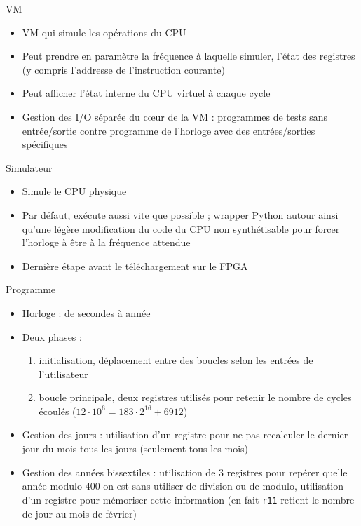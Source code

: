 \documentclass{beamer}
\begin{document}
\begin{frame}{VM}
    \begin{itemize}
        \item VM qui simule les opérations du CPU
        \item Peut prendre en paramètre la fréquence à laquelle simuler, l'état des registres (y compris l'addresse de l'instruction courante)
        \item Peut afficher l'état interne du CPU virtuel à chaque cycle
        \item Gestion des I/O séparée du c\oe{}ur de la VM : programmes de tests sans entrée/sortie contre programme de l'horloge avec des entrées/sorties spécifiques
    \end{itemize}
\end{frame}

\begin{frame}{Simulateur}
    \begin{itemize}
        \item Simule le CPU physique
        \item Par défaut, exécute aussi vite que possible ; wrapper Python autour ainsi qu'une légère modification du code du CPU non synthétisable pour forcer l'horloge à être à la fréquence attendue
        \item Dernière étape avant le téléchargement sur le FPGA
    \end{itemize}
\end{frame}

\begin{frame}[fragile]{Programme}
    \begin{itemize}
        \item Horloge : de secondes à année
        \item Deux phases :
            \begin{enumerate}
            \item initialisation, déplacement entre des boucles selon les entrées de l'utilisateur
            \item boucle principale, deux registres utilisés pour retenir le nombre de cycles écoulés ($12 \cdot 10^6 = 183 \cdot 2^16 + 6912$)
            \end{enumerate}

        \item Gestion des jours : utilisation d'un registre pour ne pas recalculer le dernier jour du mois tous les jours (seulement tous les mois)
        \item Gestion des années bissextiles : utilisation de 3 registres pour repérer quelle année modulo 400 on est sans utiliser de division ou de modulo, utilisation d'un registre pour mémoriser cette information (en fait \verb+r11+ retient le nombre de jour au mois de février)
    \end{itemize}
\end{frame}
\end{document}
